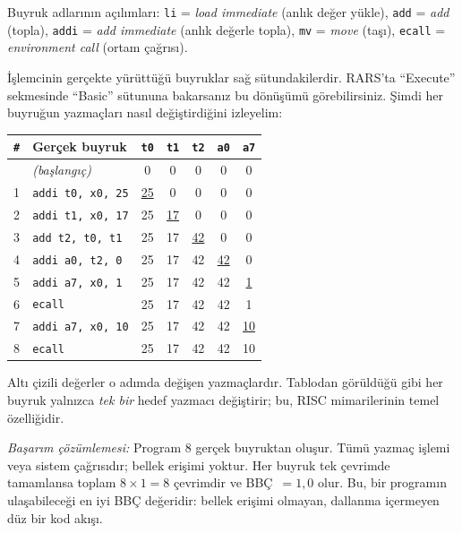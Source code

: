 \begin{ornek}[4.1]
\begin{center}
Buyruk adlarının açılımları: \texttt{li} = \emph{load immediate} (anlık değer yükle), \texttt{add} = \emph{add} (topla), \texttt{addi} = \emph{add immediate} (anlık değerle topla), \texttt{mv} = \emph{move} (taşı), \texttt{ecall} = \emph{environment call} (ortam çağrısı).
\end{center}

İşlemcinin gerçekte yürüttüğü buyruklar sağ sütundakilerdir. RARS'ta ``Execute'' sekmesinde ``Basic'' sütununa bakarsanız bu dönüşümü görebilirsiniz. Şimdi her buyruğun yazmaçları nasıl değiştirdiğini izleyelim:

\begin{center}
\small
\begin{tabular}{clccccc}
\toprule
\texttt{\#} & Gerçek buyruk & \texttt{t0} & \texttt{t1} & \texttt{t2} & \texttt{a0} & \texttt{a7} \\
\midrule
  & \emph{(başlangıç)} & 0 & 0 & 0 & 0 & 0 \\
1 & \texttt{addi t0, x0, 25} & \underline{25} & 0 & 0 & 0 & 0 \\
2 & \texttt{addi t1, x0, 17} & 25 & \underline{17} & 0 & 0 & 0 \\
3 & \texttt{add t2, t0, t1}  & 25 & 17 & \underline{42} & 0 & 0 \\
4 & \texttt{addi a0, t2, 0}  & 25 & 17 & 42 & \underline{42} & 0 \\
5 & \texttt{addi a7, x0, 1}  & 25 & 17 & 42 & 42 & \underline{1} \\
6 & \texttt{ecall}            & 25 & 17 & 42 & 42 & 1 \\
7 & \texttt{addi a7, x0, 10} & 25 & 17 & 42 & 42 & \underline{10} \\
8 & \texttt{ecall}            & 25 & 17 & 42 & 42 & 10 \\
\bottomrule
\end{tabular}
\end{center}

Altı çizili değerler o adımda değişen yazmaçlardır. Tablodan görüldüğü gibi her buyruk yalnızca \emph{tek bir} hedef yazmacı değiştirir; bu, RISC mimarilerinin temel özelliğidir.

\emph{Başarım çözümlemesi:} Program 8 gerçek buyruktan oluşur. Tümü yazmaç işlemi veya sistem çağrısıdır; bellek erişimi yoktur. Her buyruk tek çevrimde tamamlansa toplam $8 \times 1 = 8$ çevrimdir ve BBÇ~$= 1{,}0$ olur. Bu, bir programın ulaşabileceği en iyi BBÇ değeridir: bellek erişimi olmayan, dallanma içermeyen düz bir kod akışı.
\end{ornek}

